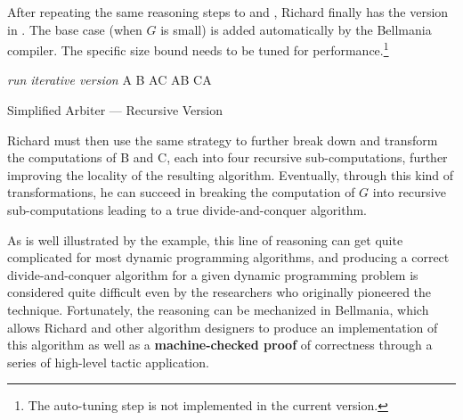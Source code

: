 After repeating
the same reasoning steps to  and ,
Richard finally has the version in .
The base case (when $G$ is small) is added automatically by the Bellmania compiler.
The specific size bound needs to be tuned for performance.\footnote{The auto-tuning step is not implemented in the current version.}


\begin{algorithm}
\renewcommand\arraystretch{1.3}
\begin{algorithmic}
\EndProcedure
   {\it run iterative version}
  \Else
  \State A 
  \State B    
  \State A
  \State C    
  \State A
  \State B    
  \State C
  \State A
  \EndIf
\end{algorithmic}
\caption{\label{overview:recursive-A}
   Simplified Arbiter --- Recursive Version}
\end{algorithm}

Richard must then use the same strategy to further break down and
transform the computations of B and C, each into four recursive sub-computations, 
further improving the locality of the resulting algorithm.
Eventually, through this kind of transformations, he can succeed in breaking the computation of $G$ into recursive sub-computations leading to a true divide-and-conquer algorithm. 

As is well illustrated by the example, this line of reasoning can get quite complicated for most dynamic programming algorithms, 
and producing a correct divide-and-conquer algorithm for a given dynamic programming problem is considered quite difficult even by the researchers who originally pioneered the technique. 
Fortunately, the reasoning can be mechanized in Bellmania, which allows
Richard and other algorithm designers to produce an implementation of this algorithm
as well as a {\bf machine-checked proof} of correctness
through a series of high-level tactic application.

